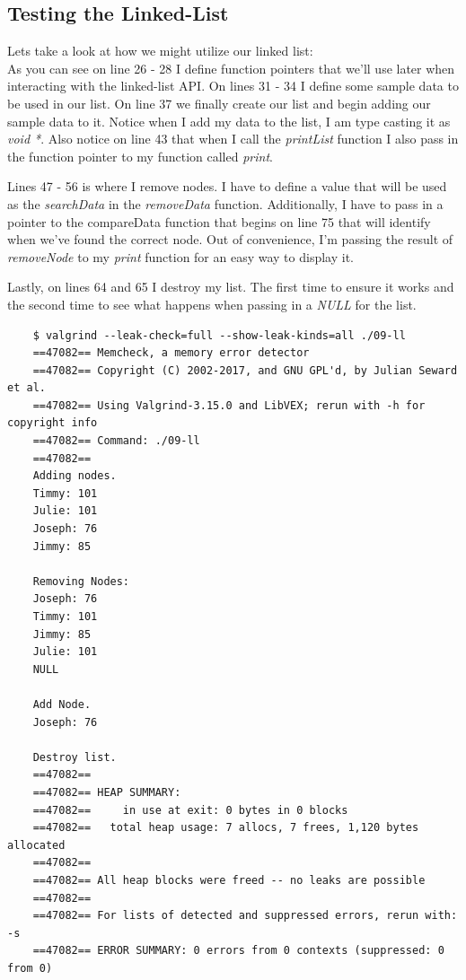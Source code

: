 \documentclass[../main.tex]{subfiles}
\begin{document}
	\subsection{Testing the Linked-List}
	Lets take a look at how we might utilize our linked list:\\
	
	
	
	As you can see on line 26 - 28 I define function pointers that we'll use later when interacting with the linked-list API.  On lines 31 - 34 I define some sample data to be used in our list.  On line 37 we finally create our list and begin adding our sample data to it.  Notice when I add my data to the list, I am type casting it as \textit{void *}.  Also notice on line 43 that when I call the \textit{printList} function I also pass in the function pointer to my function called \textit{print}.
	
	Lines 47 - 56 is where I remove nodes.  I have to define a value that will be used as the \textit{searchData} in the \textit{removeData} function.  Additionally, I have to pass in a pointer to the compareData function that begins on line 75 that will identify when we've found the correct node.  Out of convenience, I'm passing the result of \textit{removeNode} to my \textit{print} function for an easy way to display it.
	
	Lastly, on lines 64 and 65 I destroy my list.  The first time to ensure it works and the second time to see what happens when passing in a \textit{NULL} for the list.
	
	\begin{verbatim}
	$ valgrind --leak-check=full --show-leak-kinds=all ./09-ll 
	==47082== Memcheck, a memory error detector
	==47082== Copyright (C) 2002-2017, and GNU GPL'd, by Julian Seward et al.
	==47082== Using Valgrind-3.15.0 and LibVEX; rerun with -h for copyright info
	==47082== Command: ./09-ll
	==47082== 
	Adding nodes.
	Timmy: 101
	Julie: 101
	Joseph: 76
	Jimmy: 85
	
	Removing Nodes:
	Joseph: 76
	Timmy: 101
	Jimmy: 85
	Julie: 101
	NULL
	
	Add Node.
	Joseph: 76
	
	Destroy list.
	==47082== 
	==47082== HEAP SUMMARY:
	==47082==     in use at exit: 0 bytes in 0 blocks
	==47082==   total heap usage: 7 allocs, 7 frees, 1,120 bytes allocated
	==47082== 
	==47082== All heap blocks were freed -- no leaks are possible
	==47082== 
	==47082== For lists of detected and suppressed errors, rerun with: -s
	==47082== ERROR SUMMARY: 0 errors from 0 contexts (suppressed: 0 from 0)
	\end{verbatim}
	
\end{document}
